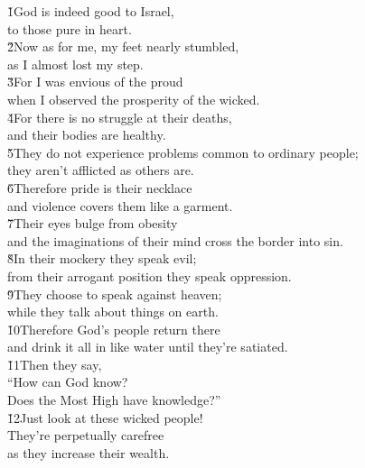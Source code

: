 \begin{poetry}
\poeml \v{1}God is indeed good to Israel, \\
\poemll    to those pure in heart. \\
\poeml \v{2}Now as for me, my feet nearly stumbled, \\
\poemll    as I almost lost my step. \\
\poeml \v{3}For I was envious of the proud \\
\poemll    when I observed the prosperity of the wicked. \\
\poeml \v{4}For there is no struggle at their deaths, \\
\poemll    and their bodies are healthy. \\
\poeml \v{5}They do not experience problems common to ordinary people; \\
\poemll    they aren't afflicted as others are. \\
\poeml \v{6}Therefore pride is their necklace \\
\poemll    and violence covers them like a garment. \\
\poeml \v{7}Their eyes bulge from obesity \\
\poemll    and the imaginations of their mind cross the border into sin. \\
\poeml \v{8}In their mockery they speak evil; \\
\poemll    from their arrogant position they speak oppression. \\
\poeml \v{9}They choose to speak against heaven; \\
\poemll    while they talk about things on earth. \\
\poeml \v{10}Therefore God's people return there \\
\poemll    and drink it all in like water until they're satiated. \\
\poeml \v{11}Then they say, \\
\poemll    ``How can God know? \\
\poemlll       Does the Most High have knowledge?'' \\
\poeml \v{12}Just look at these wicked people! \\
\poemll    They're perpetually carefree \\
\poemlll       as they increase their wealth. \\

\end{poetry}
